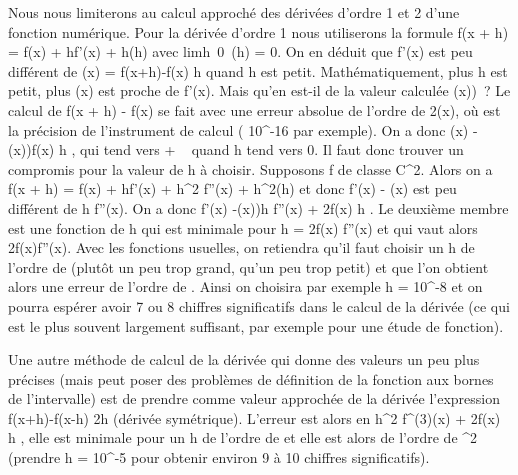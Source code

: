 Nous nous limiterons au calcul approché des dérivées d'ordre 1 et 2
d'une fonction numérique. Pour la dérivée d'ordre 1 nous utiliserons la
formule f(x + h) = f(x) + hf'(x) + h\epsilon(h) avec
limh\rightarrow~0~\epsilon(h) = 0. On en déduit que
f'(x) est peu différent de \Deltahf(x) = f(x+h)-f(x)
\over h quand h est petit. Mathématiquement, plus h est
petit, plus \Deltahf(x) est proche de f'(x). Mais qu'en est-il de
la valeur calculée \overline\Deltahf(x))~? Le
calcul de f(x + h) - f(x) se fait avec une erreur absolue de l'ordre de
2\deltaf(x), où \delta est la précision de l'instrument de calcul (
10^-16 par exemple). On a donc \textbar{}\Deltahf(x)
-\overline\Deltahf(x))\textbar{}\delta\textbar{}f(x)\textbar{} \over h , qui tend vers + \infty~
quand h tend vers 0. Il faut donc trouver un compromis pour la valeur de
h à choisir. Supposons f de classe C^2. Alors on a f(x + h) =
f(x) + hf'(x) + h^2  f''(x) +
h^2\epsilon(h) et donc \textbar{}f'(x) - \Deltahf(x)\textbar{}
est peu différent de  h 
\textbar{}f''(x)\textbar{}. On a donc \textbar{}f'(x)
-\overline\Deltahf(x))\textbar{}\leq h
 \textbar{}f''(x)\textbar{} +
2\delta\textbar{}f(x)\textbar{} \over h . Le deuxième membre
est une fonction de h qui est minimale pour h =
2\sqrt \delta\textbar{}f(x)\textbar{} \over
\textbar{}f''(x)\textbar{}  et qui vaut alors
2\sqrt\delta\textbar{}f(x)f''(x)\textbar{}. Avec les
fonctions usuelles, on retiendra qu'il faut choisir un h de l'ordre de
\sqrt\delta (plutôt un peu trop grand, qu'un peu trop
petit) et que l'on obtient alors une erreur de l'ordre de
\sqrt \delta. Ainsi on choisira par exemple h =
10^-8 et on pourra espérer avoir 7 ou 8 chiffres
significatifs dans le calcul de la dérivée (ce qui est le plus souvent
largement suffisant, par exemple pour une étude de fonction).

Une autre méthode de calcul de la dérivée qui donne des valeurs un peu
plus précises (mais peut poser des problèmes de définition de la
fonction aux bornes de l'intervalle) est de prendre comme valeur
approchée de la dérivée l'expression  f(x+h)-f(x-h)
\over 2h (dérivée symétrique). L'erreur est alors en 
h^2 
\textbar{}f^(3)(x)\textbar{} + 2\delta\textbar{}f(x)\textbar{}
\over h , elle est minimale pour un h de l'ordre de
\of\delta et elle est alors de
l'ordre de \delta^2 (prendre h = 10^-5 pour obtenir
environ 9 à 10 chiffres significatifs).

